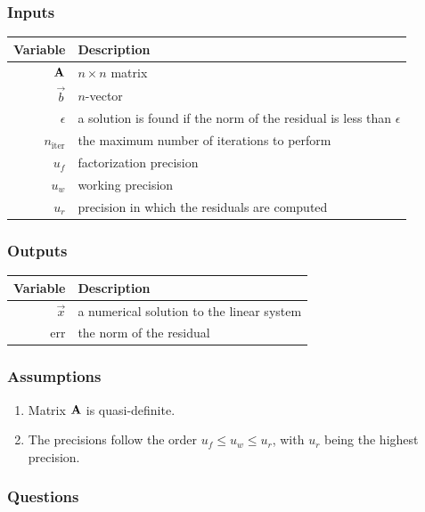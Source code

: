 \documentclass[t,12pt,numbers,fleqn]{beamer}
\begin{document}

\begin{frame}
\frametitle{Inputs}

\begin{table}[hp]
  \centering
  \label{tab:inputs}
  \begin{tabularx}{1.0\linewidth}{rX}
    \toprule
    \textbf{Variable}  & \textbf{Description} \\
    \midrule
    \(\mathbf{A}\) & \(n \times n\) matrix \\
    \(\vec{b}\)        & \(n\)-vector \\
    \(\epsilon\)        & a solution is found if the norm of the residual is less than \(\epsilon\) \\
    \(n_\mathrm{iter}\) & the maximum number of iterations to perform \\
    \(u_f\)       & factorization precision \\
    \(u_w\)       & working precision \\
    \(u_r\)       & precision in which the residuals are computed \\
    \bottomrule
  \end{tabularx}
\end{table}

\end{frame}


\begin{frame}
\frametitle{Outputs}

\begin{table}[hp]
  \centering
  \label{tab:inputs}
  \begin{tabularx}{1.0\linewidth}{rX}
    \toprule
    \textbf{Variable} & \textbf{Description} \\
    \midrule
    \(\vec{x}\)       & a numerical solution to the linear system \\
    \(\mathrm{err}\)  & the norm of the residual \\
    \bottomrule
  \end{tabularx}
\end{table}

\end{frame}


\begin{frame}
\frametitle{Assumptions}

\begin{enumerate}[{A}1]
\item Matrix \(\mathbf{A}\) is quasi-definite.
\item The precisions follow the order \(u_f \leq u_w \leq u_r\), with \(u_r\) being the
  highest precision.
\end{enumerate}

\end{frame}


\begin{frame}
\frametitle{Questions}

\end{frame}

\end{document}
